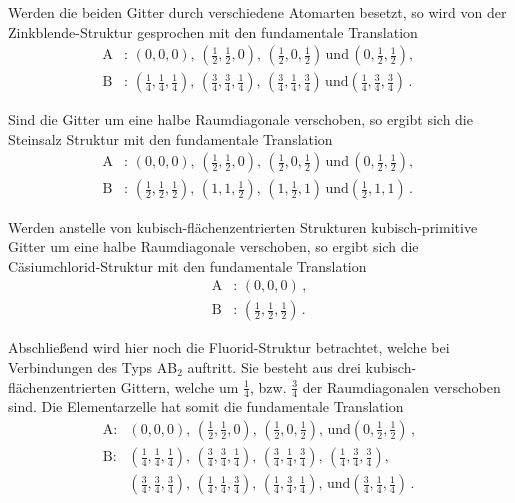 Werden die beiden Gitter durch verschiedene Atomarten besetzt, so wird von der Zinkblende-Struktur gesprochen mit den fundamentale Translation
\begin{align*}
    \text{A}&:\, \left(0, 0, 0\right),\, \left(\frac{1}{2}, \frac{1}{2}, 0\right),\, \left(\frac{1}{2}, 0, \frac{1}{2}\right)\, \text{und}\, \left(0, \frac{1}{2}, \frac{1}{2}\right),\, \\
    \text{B}&:\, \left(\frac{1}{4}, \frac{1}{4}, \frac{1}{4}\right),\, \left(\frac{3}{4}, \frac{3}{4}, \frac{1}{4}\right),\, \left(\frac{3}{4}, \frac{1}{4}, \frac{3}{4}\right)\, \text{und} \left(\frac{1}{4}, \frac{3}{4}, \frac{3}{4}\right)\,.
\end{align*}

Sind die Gitter um eine halbe Raumdiagonale verschoben, so ergibt sich die Steinsalz Struktur mit den fundamentale Translation
\begin{align*}
    \text{A}&:\, \left(0, 0, 0\right),\, \left(\frac{1}{2}, \frac{1}{2}, 0\right),\, \left(\frac{1}{2}, 0, \frac{1}{2}\right)\, \text{und}\, \left(0, \frac{1}{2}, \frac{1}{2}\right),\, \\
    \text{B}&:\, \left(\frac{1}{2}, \frac{1}{2}, \frac{1}{2}\right),\, \left(1, 1, \frac{1}{2}\right),\, \left(1, \frac{1}{2}, 1\right)\, \text{und} \left(\frac{1}{2}, 1, 1\right)\,.
\end{align*}

Werden anstelle von kubisch-flächenzentrierten Strukturen kubisch-primitive Gitter um eine halbe Raumdiagonale verschoben, so ergibt sich die Cäsiumchlorid-Struktur mit den fundamentale Translation
\begin{align*}
    \text{A}&:\, \left(0, 0, 0\right)\,,\\
    \text{B}&:\, \left(\frac{1}{2}, \frac{1}{2}, \frac{1}{2}\right)\,.
\end{align*}

Abschließend wird hier noch die Fluorid-Struktur betrachtet, welche bei Verbindungen des Typs AB$_2$ auftritt.
Sie besteht aus drei kubisch-flächenzentrierten Gittern, welche um $\frac{1}{4}$, bzw. $\frac{3}{4}$ der Raumdiagonalen verschoben sind.
Die Elementarzelle hat somit die fundamentale Translation
\begin{align*}
    \text{A}:& \left(0, 0, 0\right),\, \left(\frac{1}{2}, \frac{1}{2}, 0\right),\, \left(\frac{1}{2}, 0, \frac{1}{2}\right),\, \text{und} \left(0, \frac{1}{2}, \frac{1}{2}\right)\,,\\
    \text{B}:& \left(\frac{1}{4}, \frac{1}{4}, \frac{1}{4}\right),\, \left(\frac{3}{4}, \frac{3}{4}, \frac{1}{4}\right),\, \left(\frac{3}{4}, \frac{1}{4}, \frac{3}{4}\right),\, \left(\frac{1}{4}, \frac{3}{4}, \frac{3}{4}\right),\,\\
    & \left(\frac{3}{4}, \frac{3}{4}, \frac{3}{4}\right),\, \left(\frac{1}{4}, \frac{1}{4}, \frac{3}{4}\right),\, \left(\frac{1}{4}, \frac{3}{4}, \frac{1}{4}\right),\, \text{und} \left(\frac{3}{4}, \frac{1}{4}, \frac{1}{4}\right)\,.
\end{align*}


